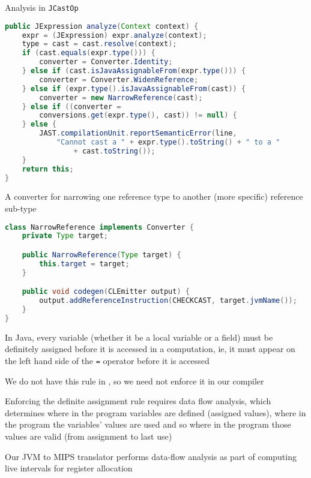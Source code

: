 \documentclass[8pt,a4paper,compress]{beamer}
\begin{document}
\begin{frame}[fragile]
\pause

Analysis in \lstinline{JCastOp}

\begin{lstlisting}[language=Java,style=focusin]
public JExpression analyze(Context context) {
    expr = (JExpression) expr.analyze(context);
    type = cast = cast.resolve(context);
    if (cast.equals(expr.type())) {
        converter = Converter.Identity;
    } else if (cast.isJavaAssignableFrom(expr.type())) {
        converter = Converter.WidenReference;
    } else if (expr.type().isJavaAssignableFrom(cast)) {
        converter = new NarrowReference(cast);
    } else if ((converter =
        conversions.get(expr.type(), cast)) != null) {
    } else {
        JAST.compilationUnit.reportSemanticError(line,
            "Cannot cast a " + expr.type().toString() + " to a "
                + cast.toString());
    }
    return this;
}
\end{lstlisting}

\pause
\bigskip

A converter for narrowing one reference type to another (more specific) reference sub-type
\begin{lstlisting}[language=Java,style=focusin]
class NarrowReference implements Converter {
    private Type target;

    public NarrowReference(Type target) {
        this.target = target;
    }

    public void codegen(CLEmitter output) {
        output.addReferenceInstruction(CHECKCAST, target.jvmName());
    }
}
\end{lstlisting}
\end{frame}

\begin{frame}[fragile]
\pause

In Java, every variable (whether it be a local variable or a field) must be definitely assigned before it is accessed in a computation, ie, it must appear on the left hand side of the \lstinline{=} operator before it is accessed

\pause
\bigskip

We do not have this rule in  \jmm, so we need not enforce it in our compiler

\pause
\bigskip

Enforcing the definite assignment rule requires data flow analysis, which determines where in the program variables are defined (assigned values), where in the program the variables' values are used and so where in the program those values are valid (from assignment to last use)

\pause
\bigskip

Our JVM to MIPS translator performs data-flow analysis as part of computing live intervals for register allocation
\end{frame}
\end{document}
